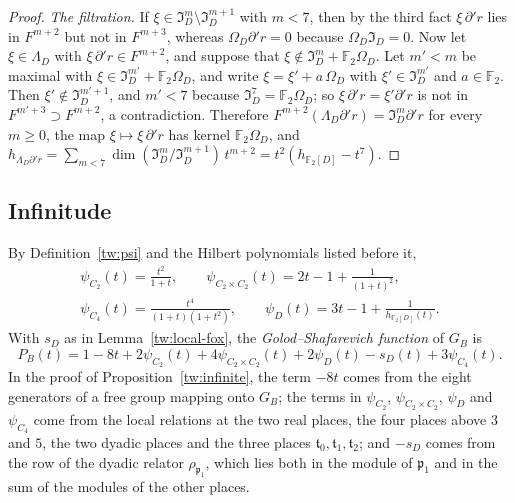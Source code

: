 \documentclass[11pt]{amsart}
\numberwithin{equation}{section}
\theoremstyle{definition}
\theoremstyle{remark}
\newcommand{\Ftwo}{\mathbb F_2}
\begin{document}
\begin{proof}
\emph{The filtration.} If $\xi\in\mathfrak I_D^m\setminus\mathfrak I_D^{m+1}$
with $m<7$, then by the third fact $\xi\,\partial'r$ lies in $F^{m+2}$ but not
in $F^{m+3}$, whereas $\Omega_D\partial'r=0$ because $\Omega_D\mathfrak I_D=0$.
Now let $\xi\in\Lambda_D$ with $\xi\,\partial'r\in F^{m+2}$, and suppose that
$\xi\notin\mathfrak I_D^m+\Ftwo\Omega_D$. Let $m'<m$ be maximal with
$\xi\in\mathfrak I_D^{m'}+\Ftwo\Omega_D$, and write $\xi=\xi'+a\,\Omega_D$
with $\xi'\in\mathfrak I_D^{m'}$ and $a\in\Ftwo$. Then
$\xi'\notin\mathfrak I_D^{m'+1}$, and $m'<7$ because
$\mathfrak I_D^7=\Ftwo\Omega_D$; so $\xi\,\partial'r=\xi'\partial'r$ is not in
$F^{m'+3}\supset F^{m+2}$, a contradiction. Therefore
$F^{m+2}(\Lambda_D\partial'r)=\mathfrak I_D^m\partial'r$ for every $m\ge0$,
the map $\xi\mapsto\xi\,\partial'r$ has kernel $\Ftwo\Omega_D$, and
$h_{\Lambda_D\partial'r}=\sum_{m<7}\dim(\mathfrak I_D^m/\mathfrak I_D^{m+1})\,t^{m+2}=t^2(h_{\Ftwo[D]}-t^7)$.
\end{proof}

\subsection{Infinitude}\label{tw:infinite-section}
By Definition~\ref{tw:psi} and the Hilbert polynomials listed before it,
\begin{equation}\label{tw:costs}
\begin{gathered}
 \psi_{C_2}(t)=\frac{t^2}{1+t},\qquad
 \psi_{C_2\times C_2}(t)=2t-1+\frac1{(1+t)^2},\\
 \psi_{C_4}(t)=\frac{t^4}{(1+t)(1+t^2)},\qquad
 \psi_D(t)=3t-1+\frac1{h_{\Ftwo[D]}(t)}.
\end{gathered}
\end{equation}
With $s_D$ as in Lemma~\ref{tw:local-fox}, the \emph{Golod--Shafarevich
function} of $G_B$ is
\begin{equation}\label{tw:PB}
 P_B(t)=1-8t+2\psi_{C_2}(t)+4\psi_{C_2\times C_2}(t)+2\psi_D(t)-s_D(t)
 +3\psi_{C_4}(t).
\end{equation}
In the proof of Proposition~\ref{tw:infinite}, the term $-8t$ comes from the
eight generators of a free group mapping onto $G_B$; the terms in
$\psi_{C_2}$, $\psi_{C_2\times C_2}$, $\psi_D$ and $\psi_{C_4}$ come from the
local relations at the two real places, the four places above $3$ and $5$,
the two dyadic places and the three places
$\mathfrak t_0,\mathfrak t_1,\mathfrak t_2$; and $-s_D$ comes from the row of
the dyadic relator $\rho_{\mathfrak p_1}$, which lies both in the module of
$\mathfrak p_1$ and in the sum of the modules of the other places.
\end{document}
